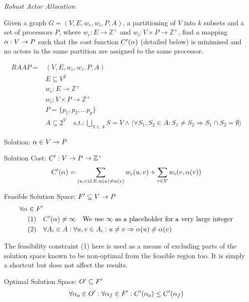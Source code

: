 \begin{definition}
{\em Robust Actor Allocation}

Given a graph $G=(V,E,w_c,w_i, P, A)$, a partitioning of $V$ into $k$ subsets and a set of processors $P$, where $w_c : E \rightarrow \mathbb{Z}^+$ and $w_i : V \times P \rightarrow \mathbb{Z}^+$, find a mapping $\alpha : V \rightarrow P$ such that
the cost function $C'(\alpha)$ (detailed below) is minimised and no actors in the same partition are assigned to the same processor.

\begin{align}
	\nonumber RAAP = & (V,E,w_c, w_i, P, A)\\
	\nonumber & E \subseteq V^2\\
	\nonumber & w_c : E \rightarrow \mathbb{Z}^+\\
	\nonumber & w_i : V \times P \rightarrow \mathbb{Z}^+\\
	\nonumber & P = \{p_1, p_2, ...p_p\} \\
	\nonumber & A \subseteq 2^V \quad s.t. : \displaystyle\bigcup\limits_{S \in A} S = V \wedge \langle \forall S_1, S_2 \in A : S_1 \neq S_2 \Rightarrow S_1 \cap S_2 = \emptyset \rangle
\end{align}

Solution: $\alpha \in V \rightarrow P$

Solution Cost: $C' : V \rightarrow P \rightarrow \mathbb{Z}^+$
\begin{align}
	\nonumber C'(\alpha) = \displaystyle\sum\limits_{(u,v) \in E : \alpha(u) \neq \alpha(v)} w_c(u,v) + \displaystyle\sum\limits_{v \in V} w_i(v, \alpha(v))
\end{align}

Feasible Solution Space: $F' \subseteq V \rightarrow P$
\begin{align}
	\nonumber \forall \alpha \in F' & \\
	\nonumber \mbox{(1)} \quad & C'(\alpha) \neq \infty \quad \mbox{We use $\infty$ as a placeholder for a very large integer} \\
	\nonumber \mbox{(2)} \quad & \forall A_i \in A : \forall u , v \in A_i : u \neq v \Rightarrow \alpha(u) \neq  \alpha(v)
\end{align}

The feasibility constraint (1) here is used as a means of excluding parts of the solution space known to be non-optimal from the feasible region too.
It is simply a shortcut but does not affect the results.

Optimal Solution Space: $O' \subseteq F'$
\begin{align}
	\nonumber 	\forall \alpha_o \in O' : \forall \alpha_f \in F' : C'(\alpha_o) \leq C'(\alpha_f)
\end{align}

\end{definition}

